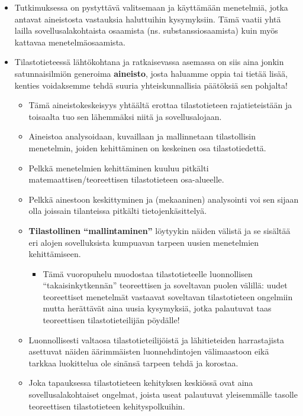 \documentclass[
]{book}
\providecommand{\tightlist}{%
  \setlength{\itemsep}{0pt}\setlength{\parskip}{0pt}}
\begin{document}
\begin{itemize}
  \begin{itemize}
  \tightlist
  \item
    Tutkimuksessa on pystyttävä valitsemaan ja käyttämään menetelmiä, jotka antavat aineistosta vastauksia haluttuihin kysymyksiin. Tämä vaatii yhtä lailla sovellusalakohtaista osaamista (ns. substanssiosaamista) kuin myös kattavaa menetelmäosaamista.
  \end{itemize}
\end{itemize}

\hfill\break
\hfill\break

\begin{itemize}
\tightlist
\item
  Tilastotieteessä lähtökohtana ja ratkaisevassa asemassa on siis aina jonkin satunnaisilmiön generoima \textbf{aineisto}, josta haluamme oppia tai tietää lisää, kenties voidaksemme tehdä suuria yhteiskunnallisia päätöksiä sen pohjalta!

  \begin{itemize}
  \tightlist
  \item
    Tämä aineistokeskeisyys yhtäältä erottaa tilastotieteen rajatieteistään ja toisaalta tuo sen lähemmäksi niitä ja sovellusalojaan.
  \item
    Aineistoa analysoidaan, kuvaillaan ja mallinnetaan tilastollisin menetelmin, joiden kehittäminen on keskeinen osa tilastotiedettä.
  \item
    Pelkkä menetelmien kehittäminen kuuluu pitkälti matemaattisen/teoreettisen tilastotieteen osa-alueelle.
  \item
    Pelkkä ainestoon keskittyminen ja (mekaaninen) analysointi voi sen sijaan olla joissain tilanteissa pitkälti tietojenkäsittelyä.
  \item
    \textbf{Tilastollinen ``mallintaminen''} löytyykin näiden välistä ja se sisältää eri alojen sovelluksista kumpuavan tarpeen uusien menetelmien kehittämiseen.

    \begin{itemize}
    \tightlist
    \item
      Tämä vuoropuhelu muodostaa tilastotieteelle luonnollisen ``takaisinkytkennän'' teoreettisen ja soveltavan puolen välillä: uudet teoreettiset menetelmät vastaavat soveltavan tilastotieteen ongelmiin mutta herättävät aina uusia kysymyksiä, jotka palautuvat taas teoreettisen tilastotieteilijän pöydälle!
    \end{itemize}
  \item
    Luonnollisesti valtaosa tilastotieteilijöistä ja lähitieteiden harrastajista asettuvat näiden äärimmäisten luonnehdintojen välimaastoon eikä tarkkaa luokittelua ole sinänsä tarpeen tehdä ja korostaa.
  \item
    Joka tapauksessa tilastotieteen kehityksen keskiössä ovat aina sovellusalakohtaiset ongelmat, joista useat palautuvat yleisemmälle tasolle teoreettisen tilastotieteen kehityspolkuihin.
  \end{itemize}
\end{itemize}
\end{document}
